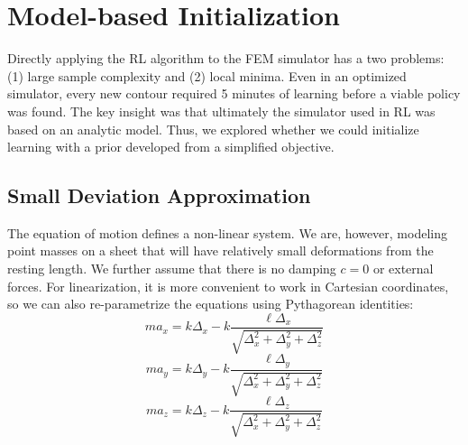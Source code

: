\section{Model-based Initialization}
Directly applying the RL algorithm to the FEM simulator has a two problems: (1) large sample complexity and (2) local minima.
Even in an optimized simulator, every new contour required 5 minutes of learning before a viable policy was found.
The key insight was that ultimately the simulator used in RL was based on an analytic model.
Thus, we explored whether we could initialize learning with a prior developed from a simplified objective.

\subsection{Small Deviation Approximation}
The equation of motion defines a non-linear system. We are, however, modeling point masses on a sheet that will have relatively small deformations from the resting length. 
We further assume that there is no damping $c=0$ or external forces.
For linearization, it is more convenient to work in Cartesian coordinates, so we can also re-parametrize the equations using Pythagorean identities:
\[
m a_x = k  \Delta_x - k \frac{\ell \Delta_x }{\sqrt{\Delta_x^2 + \Delta_y^2 + \Delta_z^2}} 
\]
\[
m a_y = k  \Delta_y - k \frac{\ell \Delta_y }{\sqrt{\Delta_x^2 + \Delta_y^2 + \Delta_z^2}}  
\]
\[
m a_z = k  \Delta_z - k\frac{\ell \Delta_z }{\sqrt{\Delta_x^2 + \Delta_y^2 + \Delta_z^2}} 
\]

